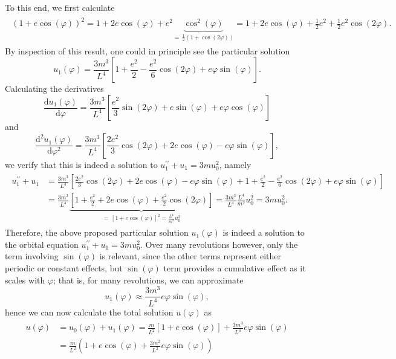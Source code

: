 \documentclass[a4paper,11pt]{article}
\numberwithin{equation}{section}
\begin{document}
{To this end, we first calculate \begin{align}
\begin{aligned}
(1+e\cos(\varphi))^2 = 1 + 2e\cos(\varphi) + e^2\underbrace{\cos^2(\varphi)}_{=\,\tfrac{1}{2}(1+\cos(2\varphi))} = 1 + 2e\cos(\varphi) + \frac{1}{2}e^2 + \frac{1}{2}e^2\cos(2\varphi).
\end{aligned}
\end{align} By inspection of this result, one could in principle see the particular solution \begin{equation}
u_1(\varphi) = \frac{3m^3}{L^4}\left[1+\frac{e^2}{2}-\frac{e^2}{6}\cos(2\varphi)+e\varphi\sin(\varphi)\right]. 
\end{equation} Calculating the derivatives \begin{equation}
\frac{\mathrm{d}u_1(\varphi)}{\mathrm{d}\varphi} = \frac{3m^3}{L^4}\left[\frac{e^2}{3}\sin(2\varphi) + e\sin(\varphi)+ e\varphi\cos(\varphi)\right]
\end{equation} and \begin{equation}
\frac{\mathrm{d}^2u_1(\varphi)}{\mathrm{d}\varphi^2} = \frac{3m^3}{L^4}\left[\frac{2e^2}{3}\cos(2\varphi)+2e\cos(\varphi)-e\varphi\sin(\varphi)\right],
\end{equation} we verify that this is indeed a solution to $u_1^{\prime\prime} + u_1 = 3mu_0^2$, namely \begin{align}
\begin{aligned}
u_1^{\prime\prime} + u_1 &= \frac{3m^3}{L^4}\left[\frac{2e^2}{3}\cos(2\varphi)+2e\cos(\varphi)-e\varphi\sin(\varphi) + 1 + \frac{e^2}{2}-\frac{e^2}{6}\cos(2\varphi)+e\varphi\sin(\varphi)\right] \\
&= \frac{3m^3}{L^4}\underbrace{\left[1 + \frac{e^2}{2}+2e\cos(\varphi) + \frac{e^2}{2}\cos(2\varphi)\right]}_{=\,[1+e\cos(\varphi)]^2 = \tfrac{L^4}{m^2}u_0^2} = \frac{3m^3}{L^4}\frac{L^4}{m^2}u_0^2 = 3mu_0^2.
\end{aligned}
\end{align} Therefore, the above proposed particular solution $u_1(\varphi)$ is indeed a solution to the orbital equation $u_1^{\prime\prime} + u_1 = 3mu_0^2$. Over many revolutions however, only the term involving $\sin(\varphi)$ is relevant, since the other terms represent either periodic or constant effects, but $\sin(\varphi)$ term provides a cumulative effect as it scales with $\varphi$; that is, for many revolutions, we can approximate \begin{equation}
u_1(\varphi) \approx \frac{3m^3}{L^4}e\varphi\sin(\varphi),
\end{equation} hence we can now calculate the total solution $u(\varphi)$ as \begin{align}\begin{aligned}
u(\varphi) &= u_0(\varphi) + u_1(\varphi) = \frac{m}{L^2}[1+e\cos(\varphi)] + \frac{3m^3}{L^4}e\varphi\sin(\varphi) \\ &= \frac{m}{L^2}\left(1 + e\cos(\varphi)+\frac{3m^2}{L^2}e\varphi\sin(\varphi)\right)
\end{aligned}\end{align}

}
\end{document}
